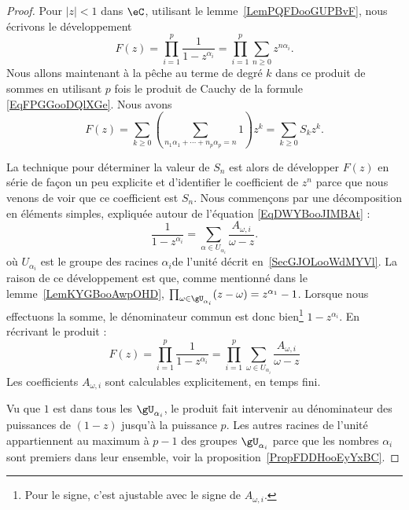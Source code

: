 \begin{proof}
    Pour \( | z |<1\) dans \( \eC\), utilisant le lemme~\ref{LemPQFDooGUPBvF}, nous écrivons le développement
    \begin{equation}
        F(z)=\prod_{i=1}^p\frac{1}{ 1-z^{\alpha_i} }=\prod_{i=1}^p\sum_{n\geq 0}z^{n\alpha_i}.
    \end{equation}
    Nous allons maintenant à la pêche au terme de degré \( k\) dans ce produit de sommes en utilisant \( p\) fois le produit de Cauchy de la formule \eqref{EqFPGGooDQlXGe}. Nous avons
    \begin{equation}
        F(z)=\sum_{k\geq 0}\left( \sum_{n_1\alpha_1+\cdots +n_p\alpha_p=n}1 \right)z^k=\sum_{k\geq 0}S_kz^k.
    \end{equation}

    La technique pour déterminer la valeur de \( S_n\) est alors de développer \( F(z)\) en série de façon un peu explicite et d'identifier le coefficient de \( z^n\) parce que nous venons de voir que ce coefficient est \( S_n\). Nous commençons par une décomposition en éléments simples, expliquée autour de l'équation \eqref{EqDWYBooJIMBAt} :
    \begin{equation}
        \frac{1}{ 1-z^{\alpha_i} }=\sum_{\alpha\in U_{\alpha_i}}\frac{ A_{\omega,i} }{ \omega-z }.
    \end{equation}
    où \( U_{\alpha_i}\) est le groupe des racines \( \alpha_i\)\ieme de l'unité décrit en~\ref{SecGJOLooWdMYVl}. La raison de ce développement est que, comme mentionné dans le lemme~\ref{LemKYGBooAwpOHD}, \( \prod_{\omega\in\gU_{\alpha_i}}(z-\omega)=z^{\alpha_1}-1\). Lorsque nous effectuons la somme, le dénominateur commun est donc bien\footnote{Pour le signe, c'est ajustable avec le signe de \( A_{\omega,i}\).} \( 1-z^{\alpha_i}\).
    En récrivant le produit :
    \begin{equation}
        F(z)=\prod_{i=1}^{p}\frac{1}{ 1-z^{\alpha_i} }=\prod_{i=1}^p\sum_{\omega\in U_{\alpha_i}}\frac{ A_{\omega,i} }{ \omega-z }
    \end{equation}
    Les coefficients \( A_{\omega,i}\) sont calculables explicitement, en temps fini.

    Vu que \( 1\) est dans tous les \( \gU_{\alpha_i}\), le produit fait intervenir au dénominateur des puissances de \( (1-z)\) jusqu'à la puissance \( p\). Les autres racines de l'unité appartiennent au maximum à \( p-1\) des groupes \( \gU_{\alpha_i}\) parce que les nombres \( \alpha_i\) sont premiers dans leur ensemble, voir la proposition~\ref{PropFDDHooEyYxBC}.


\end{proof}
